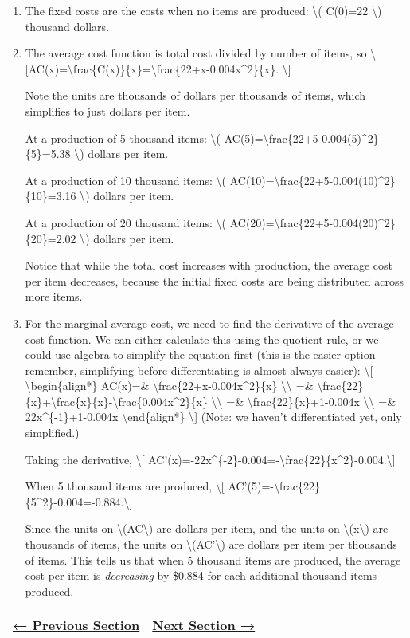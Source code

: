 \begin{enumerate}
\item
  The fixed costs are the costs when no items are produced:
  \textbackslash{}( C(0)=22 \textbackslash{}) thousand dollars.
\item
  The average cost function is total cost divided by number of items, so
  \textbackslash{}{[}AC(x)=\textbackslash{}frac\{C(x)\}\{x\}=\textbackslash{}frac\{22+x-0.004x\^{}2\}\{x\}.
  \textbackslash{}{]}

  Note the units are thousands of dollars per thousands of items, which
  simplifies to just dollars per item.

  At a production of 5 thousand items: \textbackslash{}(
  AC(5)=\textbackslash{}frac\{22+5-0.004(5)\^{}2\}\{5\}=5.38
  \textbackslash{}) dollars per item.

  At a production of 10 thousand items: \textbackslash{}(
  AC(10)=\textbackslash{}frac\{22+5-0.004(10)\^{}2\}\{10\}=3.16
  \textbackslash{}) dollars per item.

  At a production of 20 thousand items: \textbackslash{}(
  AC(20)=\textbackslash{}frac\{22+5-0.004(20)\^{}2\}\{20\}=2.02
  \textbackslash{}) dollars per item.

  Notice that while the total cost increases with production, the
  average cost per item decreases, because the initial fixed costs are
  being distributed across more items.
\item
  For the marginal average cost, we need to find the derivative of the
  average cost function. We can either calculate this using the quotient
  rule, or we could use algebra to simplify the equation first (this is
  the easier option -- remember, simplifying before differentiating is
  almost always easier): \textbackslash{}{[}
  \textbackslash{}begin\{align*\} AC(x)=\&
  \textbackslash{}frac\{22+x-0.004x\^{}2\}\{x\}
  \textbackslash{}\textbackslash{} =\&
  \textbackslash{}frac\{22\}\{x\}+\textbackslash{}frac\{x\}\{x\}-\textbackslash{}frac\{0.004x\^{}2\}\{x\}
  \textbackslash{}\textbackslash{} =\&
  \textbackslash{}frac\{22\}\{x\}+1-0.004x
  \textbackslash{}\textbackslash{} =\& 22x\^{}\{-1\}+1-0.004x
  \textbackslash{}end\{align*\} \textbackslash{}{]} (Note: we haven't
  differentiated yet, only simplified.)

  Taking the derivative, \textbackslash{}{[}
  AC'(x)=-22x\^{}\{-2\}-0.004=-\textbackslash{}frac\{22\}\{x\^{}2\}-0.004.\textbackslash{}{]}

  When 5 thousand items are produced, \textbackslash{}{[}
  AC'(5)=-\textbackslash{}frac\{22\}\{5\^{}2\}-0.004=-0.884.\textbackslash{}{]}

  Since the units on \textbackslash{}(AC\textbackslash{}) are dollars
  per item, and the units on \textbackslash{}(x\textbackslash{}) are
  thousands of items, the units on \textbackslash{}(AC'\textbackslash{})
  are dollars per item per thousands of items. This tells us that when 5
  thousand items are produced, the average cost per item is
  \emph{decreasing} by \$0.884 for each additional thousand items
  produced.
\end{enumerate}

\begin{longtable}[]{@{}ll@{}}
\toprule
\endhead
\href{section2-3.php}{← Previous Section} & \href{section2-5.php}{Next
Section →}\tabularnewline
\bottomrule
\end{longtable}
